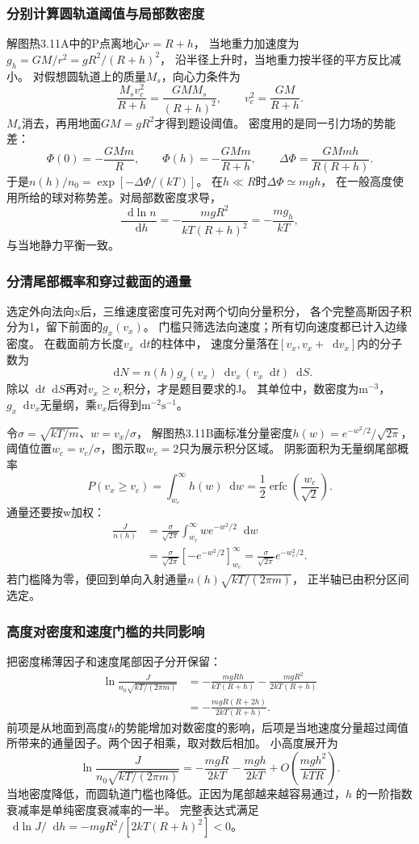 \documentclass[UTF8,fontset=fandol,a4paper,11pt]{ctexart}
\newcommand{\dd}{\mathop{}\!\mathrm{d}}
\begin{document}
\subsubsection*{分别计算圆轨道阈值与局部数密度}
解图热3.11A中的P点离地心$r=R+h$，
当地重力加速度为$g_h=GM/r^2=gR^2/(R+h)^2$，
沿半径上升时，当地重力按半径的平方反比减小。
对假想圆轨道上的质量$M_s$，向心力条件为
\[
\frac{M_sv_c^2}{R+h}
=\frac{GMM_s}{(R+h)^2},\qquad
v_c^2=\frac{GM}{R+h}.
\]
$M_s$消去，再用地面$GM=gR^2$才得到题设阈值。
密度用的是同一引力场的势能差：
\[
\Phi(0)=-\frac{GMm}{R},\qquad
\Phi(h)=-\frac{GMm}{R+h},\qquad
\Delta\Phi=\frac{GMmh}{R(R+h)}.
\]
于是$n(h)/n_0=\exp[-\Delta\Phi/(kT)]$。
在$h\ll R$时$\Delta\Phi\simeq mgh$，
在一般高度使用所给的球对称势差。对局部数密度求导，
\[
\frac{\dd\ln n}{\dd h}
=-\frac{mgR^2}{kT(R+h)^2}
=-\frac{mg_h}{kT},
\]
与当地静力平衡一致。

\subsubsection*{分清尾部概率和穿过截面的通量}
选定外向法向x后，三维速度密度可先对两个切向分量积分，
各个完整高斯因子积分为1，留下前面的$g_x(v_x)$。
门槛只筛选法向速度；所有切向速度都已计入边缘密度。
在截面前方长度$v_x\dd t$的柱体中，
速度分量落在$[v_x,v_x+\dd v_x]$内的分子数为
\[
\dd N=n(h)g_x(v_x)\dd v_x\,(v_x\dd t)\dd S.
\]
除以$\dd t\dd S$再对$v_x\ge v_c$积分，才是题目要求的J。
其单位中，数密度为$\mathrm{m^{-3}}$，
$g_x\dd v_x$无量纲，乘$v_x$后得到$\mathrm{m^{-2}s^{-1}}$。

令$\sigma=\sqrt{kT/m}$、$w=v_x/\sigma$，
解图热3.11B画标准分量密度$h(w)=e^{-w^2/2}/\sqrt{2\pi}$，
阈值位置$w_c=v_c/\sigma$，图示取$w_c=2$只为展示积分区域。
阴影面积为无量纲尾部概率
\[
P(v_x\ge v_c)=\int_{w_c}^\infty h(w)\dd w
=\frac12\operatorname{erfc}\left(\frac{w_c}{\sqrt2}\right).
\]
通量还要按w加权：
\[
\begin{aligned}
\frac{J}{n(h)}
&=\frac{\sigma}{\sqrt{2\pi}}
\int_{w_c}^\infty w e^{-w^2/2}\dd w\\
&=\frac{\sigma}{\sqrt{2\pi}}
[-e^{-w^2/2}]_{w_c}^{\infty}
=\frac{\sigma}{\sqrt{2\pi}}e^{-w_c^2/2}.
\end{aligned}
\]
若门槛降为零，便回到单向入射通量$n(h)\sqrt{kT/(2\pi m)}$，
正半轴已由积分区间选定。

\subsubsection*{高度对密度和速度门槛的共同影响}
把密度稀薄因子和速度尾部因子分开保留：
\[
\begin{aligned}
\ln\frac{J}{n_0\sqrt{kT/(2\pi m)}}
&=-\frac{mgRh}{kT(R+h)}
-\frac{mgR^2}{2kT(R+h)}\\
&=-\frac{mgR(R+2h)}{2kT(R+h)}.
\end{aligned}
\]
前项是从地面到高度$h$的势能增加对数密度的影响，后项是当地速度分量超过阈值所带来的通量因子。两个因子相乘，取对数后相加。
小高度展开为
\[
\ln\frac{J}{n_0\sqrt{kT/(2\pi m)}}
=-\frac{mgR}{2kT}-\frac{mgh}{2kT}
+O\left(\frac{mgh^2}{kTR}\right).
\]
当地密度降低，而圆轨道门槛也降低。正因为尾部越来越容易通过，$h$ 的一阶指数衰减率是单纯密度衰减率的一半。
完整表达式满足
$\dd\ln J/\dd h=-mgR^2/[2kT(R+h)^2]<0$。
\end{document}
